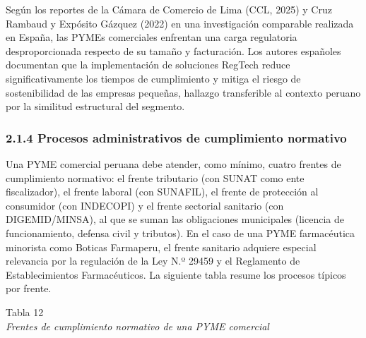 \documentclass[12pt,a4paper,oneside]{report}
\begin{document}
Según los reportes de la Cámara de Comercio de Lima (CCL, 2025) y Cruz
Rambaud y Expósito Gázquez (2022) en una investigación comparable
realizada en España, las PYMEs comerciales enfrentan una carga
regulatoria desproporcionada respecto de su tamaño y facturación. Los
autores españoles documentan que la implementación de soluciones RegTech
reduce significativamente los tiempos de cumplimiento y mitiga el riesgo
de sostenibilidad de las empresas pequeñas, hallazgo transferible al
contexto peruano por la similitud estructural del segmento.

\subsubsection{2.1.4 Procesos administrativos de cumplimiento
normativo}\label{procesos-administrativos-de-cumplimiento-normativo}

Una PYME comercial peruana debe atender, como mínimo, cuatro frentes de
cumplimiento normativo: el frente tributario (con SUNAT como ente
fiscalizador), el frente laboral (con SUNAFIL), el frente de protección
al consumidor (con INDECOPI) y el frente sectorial sanitario (con
DIGEMID/MINSA), al que se suman las obligaciones municipales (licencia
de funcionamiento, defensa civil y tributos). En el caso de una PYME
farmacéutica minorista como Boticas Farmaperu, el frente sanitario
adquiere especial relevancia por la regulación de la Ley N.º 29459 y el
Reglamento de Establecimientos Farmacéuticos. La siguiente tabla resume
los procesos típicos por frente.

\label{_Toc231672267}{}Tabla 12\\
\emph{Frentes de cumplimiento normativo de una PYME comercial}
\end{document}
